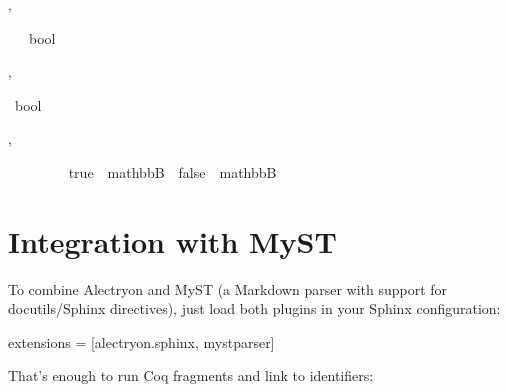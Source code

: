 \documentclass[letterpaper,10pt,english]{sphinxmanual}
\begin{document}
\begin{itemize}
\begin{alectryon}
  \sep
  \begin{sentence}
    \begin{input}
      ~~~bool\nl
    \end{input}
  \end{sentence}
  \sep
  \begin{sentence}
    \begin{input}
      ~bool
    \end{input}
    \sep
    \begin{output}
      \begin{messages}
        \begin{message}
          ~~~~\nl
          ~~~~true~~mathbbB~~false~~mathbbB
        \end{message}
      \end{messages}
    \end{output}
  \end{sentence}
\end{alectryon}

\end{itemize}

\sphinxstepscope


\chapter{Integration with MyST}
\label{\detokenize{MyST:integration-with-myst}}\label{\detokenize{MyST::doc}}
\sphinxAtStartPar
To combine Alectryon and MyST (a Markdown parser with support for docutils/Sphinx directives), just load both plugins in your Sphinx configuration:

\begin{sphinxVerbatim}[commandchars=\\\{\}]
extensions = [\PYGZdq{}alectryon.sphinx\PYGZdq{}, \PYGZdq{}myst\PYGZus{}parser\PYGZdq{}]
\end{sphinxVerbatim}

\sphinxAtStartPar
That’s enough to run Coq fragments and link to identifiers:
\end{document}
